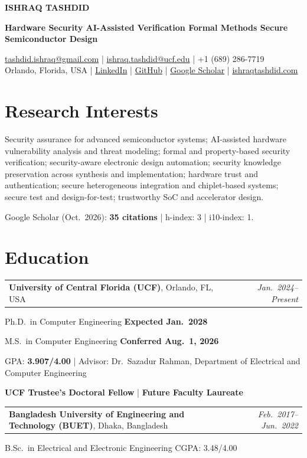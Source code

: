 \documentclass[11pt,letterpaper]{article}
\makeatletter
\newcommand{\entry}[2]{\par\noindent
  \begin{tabularx}{\textwidth}{@{}>{\raggedright\arraybackslash}X@{\hspace{1em}}r@{}}
    #1 & \textit{#2}
  \end{tabularx}\par}
\newcommand{\subnote}[1]{{\color{cvgray}#1}\par}
\makeatother
\begin{document}
\begin{center}
  {\color{cvnavy}\fontsize{22}{26}\selectfont\bfseries ISHRAQ TASHDID}\par
  \vspace{6pt}
  {\small\bfseries Hardware Security \;\textbullet\; AI-Assisted Verification \;\textbullet\;
   Formal Methods \;\textbullet\; Secure Semiconductor Design}\par
  \vspace{5pt}
  {\small
  \href{mailto:tashdid.ishraq@gmail.com}{tashdid.ishraq@gmail.com} \;|\;
  \href{mailto:ishraq.tashdid@ucf.edu}{ishraq.tashdid@ucf.edu} \;|\; +1 (689) 286-7719\\[2pt]
  Orlando, Florida, USA \;|\;
  \href{https://www.linkedin.com/in/ishraqtashdid}{LinkedIn} \;|\;
  \href{https://github.com/IshraqAtUCF}{GitHub} \;|\;
  \href{https://scholar.google.com/citations?user=gYcWmKYAAAAJ}{Google Scholar} \;|\;
  \href{https://ishraqtashdid.com}{ishraqtashdid.com}}
\end{center}

\section*{Research Interests}
Security assurance for advanced semiconductor systems; AI-assisted hardware vulnerability analysis and
threat modeling; formal and property-based security verification; security-aware electronic design
automation; security knowledge preservation across synthesis and implementation; hardware trust and
authentication; secure heterogeneous integration and chiplet-based systems; secure test and
design-for-test; trustworthy SoC and accelerator design.\par
\subnote{Google Scholar (Oct.\ 2026): \textbf{35 citations} \;|\; h-index: 3 \;|\; i10-index: 1.}

\section*{Education}
\entry{\textbf{University of Central Florida (UCF)}, Orlando, FL, USA}{Jan.\ 2024--Present}
Ph.D.\ in Computer Engineering \hfill \textbf{Expected Jan.\ 2028}\par
M.S.\ in Computer Engineering \hfill \textbf{Conferred Aug.\ 1, 2026}\par
GPA: \textbf{3.907/4.00} \;|\; Advisor: Dr.\ Sazadur Rahman, Department of Electrical and Computer Engineering\par
\textbf{UCF Trustee's Doctoral Fellow} \;|\; \textbf{Future Faculty Laureate}\par
\vspace{5pt}
\entry{\textbf{Bangladesh University of Engineering and Technology (BUET)}, Dhaka, Bangladesh}{Feb.\ 2017--Jun.\ 2022}
B.Sc.\ in Electrical and Electronic Engineering \hfill CGPA: 3.48/4.00\par
\end{document}
